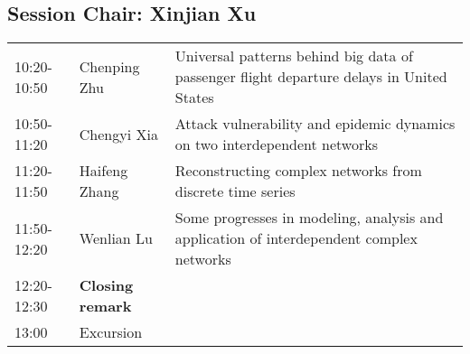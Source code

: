 \documentclass[oneside,A4paper,12pt]{article}
\begin{document}
\subsection*{Session \uppercase\expandafter{}  \hspace{10mm} Chair: Xinjian Xu}
\label{sec:org8036179}

\begin{center}
\begin{tabular}{p{2.5cm}p{4cm}p{8.5cm}}
\hline
10:20-10:50 & Chenping Zhu & Universal patterns behind big data of passenger flight departure delays in United States\\
10:50-11:20 & Chengyi Xia & Attack vulnerability and epidemic dynamics on two interdependent networks\\
11:20-11:50 & Haifeng Zhang & Reconstructing complex networks from discrete time series\\
11:50-12:20 & Wenlian Lu & Some progresses in modeling, analysis and application of interdependent complex networks\\
\cellcolor{red!25}12:20-12:30 & \cellcolor{red!25}\textbf{Closing remark} & \cellcolor{red!25}\\
13:00 & Excursion & \\
\hline
\end{tabular}
\end{center}



\newpage
\end{document}
